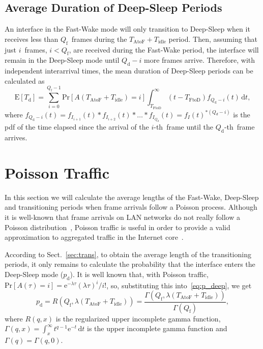 \documentclass[journal,10pt,letterpaper]{IEEEtran}
\begin{document}
\subsection{Average Duration of Deep-Sleep Periods}
\label{sec:deep}

An interface in the Fast-Wake mode will only transition to Deep-Sleep
when it receives less than $Q_{\mathrm{f}}$~frames during the
$T_{\mathrm{AtoF}} + T_{\mathrm{idle}}$ period. Then, assuming that
just $i$~frames, $i<Q_{\mathrm{f}}$, are received during the Fast-Wake
period, the interface will remain in the Deep-Sleep mode until
$Q_{\mathrm{d}}-i$ more frames arrive. Therefore, with independent
interarrival times, the mean duration of Deep-Sleep periods can be
calculated as
\begin{equation}
    \label{eq:T_deep}
  \mathrm{E}[T_{\mathrm{d}}] = \sum_{i=0}^{Q_{\mathrm{f}}-1} \mathrm{Pr}[A(T_{\mathrm{AtoF}} + T_{\mathrm{idle}}) = i] \int_{T_{\mathrm{FtoD}}}^{\infty} \! (t - T_{\mathrm{FtoD}}) f_{Q_{\mathrm{d}}-i}(t) \, \mathrm{d}t,
\end{equation}
where $f_{Q_{\mathrm{d}}-i}(t) = f_{I_{i+1}}(t) \ast f_{I_{i+2}}(t)
\ast \ldots \ast f_{I_{Q_d}}(t) = f_I(t)^{\ast (Q_d-i)}$ is the pdf of
the time elapsed since the arrival of the $i$-th~frame until the
$Q_{\mathrm{d}}$-th~frame arrives.

\section{Poisson Traffic}
\label{sec:poisson_model}

In this section we will calculate the average lengths of the
Fast-Wake, Deep-Sleep and transitioning periods when frame arrivals
follow a Poisson process. Although it is well-known that frame
arrivals on LAN networks do not really follow a Poisson
distribution~\cite{leland94:on_the_self_similar}, Poisson traffic is
useful in order to provide a valid approximation to aggregated traffic
in the Internet core~\cite{vishwanath09:_how_poisson_is_tcp_traffic}.

According to Sect.~\ref{sec:trans}, to obtain the average length of
the transitioning periods, it only remains to calculate the
probability that the interface enters the Deep-Sleep mode
($p_{\mathrm{d}}$). It is well known that, with Poisson traffic,
$\mathrm{Pr}[A(\tau)=i] = \mathrm{e}^{-\lambda \tau} (\lambda \tau)^i
/ i!$, so, substituting this into~\eqref{eq:p_deep}, we get
\begin{equation}
  \label{eq:p_deep_poisson}
  p_{\mathrm{d}} = R(Q_{\mathrm{f}}, \lambda(T_{\mathrm{AtoF}} + T_{\mathrm{idle}})) 
  = \frac{\Gamma (Q_{\mathrm{f}}, \lambda(T_{\mathrm{AtoF}} + T_{\mathrm{idle}}))}{\Gamma (Q_{\mathrm{f}})},
\end{equation}
where $R(q,x)$ is the regularized upper incomplete gamma function,
$\Gamma (q,x) = \int_x^{\infty} t^{q-1} \mathrm{e}^{-t}\, \mathrm{d}t$
is the upper incomplete gamma function and $\Gamma (q) = \Gamma
(q,0)$.
\end{document}
